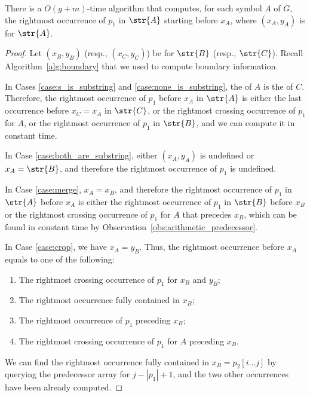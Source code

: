 \begin{proposition}\label{claim:preceding_x_A}
There is a $O(g+m)$-time algorithm that computes, for each symbol $A$ of $G$, the rightmost occurrence of $p_1$ in $\str{A}$ starting before $x_A$, where $(x_A,y_A)$ is  for $\str{A}$. 
\end{proposition}    
\begin{proof}   
Let $(x_B,y_B)$ (resp., $(x_C,y_C)$) be  for $\str{B}$ (resp., $\str{C}$). Recall Algorithm~\ref{alg:boundary} that we used to compute boundary information. 

In Cases \ref{case:s_is_substring} and \ref{case:none_is_substring}, the  of $A$ is the  of $C$. Therefore, the rightmost occurrence of $p_1$ before $x_A$ in $\str{A}$ is either the last occurrence before $x_C=x_A$ in $\str{C}$, or the rightmost crossing occurrence of $p_1$ for $A$, or the rightmost occurrence of $p_1$ in $\str{B}$, and we can compute it in constant time.

In Case \ref{case:both_are_substring}, either $(x_A,y_A)$ is undefined or $x_A = \str{B}$, and therefore the rightmost occurrence of $p_1$ is undefined. 

In Case \ref{case:merge}, $x_A=x_B$, and therefore the rightmost occurrence of $p_1$ in $\str{A}$ before $x_A$ is either the rightmost occurrence of $p_1$ in $\str{B}$ before $x_B$ or the rightmost crossing occurrence of $p_1$ for $A$ that precedes $x_B$, which can be found in constant time by Observation~\ref{obs:arithmetic_predecessor}. 

In Case \ref{case:crop}, we have $x_A=y_B$. Thus, the rightmost occurrence before $x_A$ equals to one of the following: 
        \begin{enumerate}
            \item The rightmost crossing occurrence of $p_1$ for $x_B$ and $y_B$; 
            \item The rightmost occurrence fully contained in $x_B$; 
            \item The rightmost occurrence of $p_1$ preceding $x_B$;
            \item The rightmost crossing occurrence of $p_1$ for $A$ preceding $x_B$.
        \end{enumerate}
We can find the rightmost occurrence fully contained in $x_B=p_2[i \dots j]$ by querying the predecessor array for $j-|p_1|+1$, and the two other occurrences have been already computed. 

\end{proof}
    
